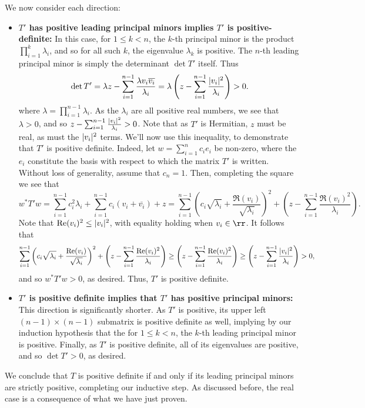 \documentclass{scrartcl}
\begin{document}
\begin{solution}
        We now consider each direction:
        \begin{itemize}
            \item \textbf{$T'$ has positive leading principal minors implies $T'$ is positive-definite:} In this case, for $1\le k <n$, the $k$-th principal minor is the product $\prod_{i=1}^k \lambda_i$, and so for all such $k$, the eigenvalue $\lambda_k$ is positive. The $n$-th leading principal minor is simply the determinant $\det T'$ itself. Thus
            \[\det T'=\lambda z - \sum_{i=1}^{n-1} \frac{\lambda v_i\overline{v_i}}{\lambda_i}=\lambda\left(z - \sum_{i=1}^{n-1} \frac{ \lvert v_i\rvert^2}{\lambda_i}\right)>0.\]
            where $\lambda=\prod_{i=1}^{n-1}\lambda_i$. As the $\lambda_i$ are all positive real numbers, we see that $\lambda>0$, and so $z - \sum_{i=1}^{n-1} \frac{ \lvert v_i\rvert^2}{\lambda_i}>0$. Note that as $T'$ is Hermitian, $z$ must be real, as must the $\lvert v_i\rvert^2$ terms. We'll now use this inequality, to demonstrate that $T'$ is positive definite. Indeed, let $w=\sum_{i=1}^n c_ie_i$ be non-zero, where the $e_i$ constitute the basis with respect to which the matrix $T'$ is written. Without loss of generality, assume that $c_n=1$. Then, completing the square we see that 
            \[w^\ast T' w=\sum_{i=1}^{n-1} c_i^2\lambda_i+\sum_{i=1}^{n-1}c_i(v_i+\overline{v_i})+z=\sum_{i=1}^{n-1} \left(c_i\sqrt{\lambda_i} + \frac{\Re (v_i)}{\sqrt{\lambda_i}}\right)^2 + \left(z-\sum_{i=1}^{n-1}\frac{\Re (v_i)^2}{\lambda_i} \right).\]
            Note that $\operatorname{Re} (v_i)^2\le \lvert v_i\rvert^2$, with equality holding when $v_i\in \rr$. It follows that
            \[\sum_{i=1}^{n-1} \left(c_i\sqrt{\lambda_i} + \frac{\operatorname{Re} (v_i)}{\sqrt{\lambda_i}}\right)^2 + \left(z-\sum_{i=1}^{n-1}\frac{\operatorname{Re} (v_i)^2}{\lambda_i} \right)\ge \left(z-\sum_{i=1}^{n-1}\frac{\operatorname{Re} (v_i)^2}{\lambda_i} \right) \ge \left(z-\sum_{i=1}^{n-1}\frac{\lvert v_i\rvert^2}{\lambda_i} \right)>0,\]
            and so $w^\ast T' w>0$, as desired. Thus, $T'$ is positive definite.
            
            \item \textbf{$T'$ is positive definite implies that $T'$ has positive principal minors:} This  direction is significantly shorter. As $T'$ is positive, its upper left $(n-1)\times (n-1)$ submatrix is positive definite as well, implying by our induction hypothesis that the for $1\le k < n$, the $k$-th leading principal minor is positive. Finally, as $T'$ is positive definite, all of its eigenvalues are positive, and so $\det T'>0$, as desired.
        \end{itemize}
        We conclude that $T$ is positive definite if and only if its leading principal minors are strictly positive, completing our inductive step. As discussed before, the real case is a consequence of what we have just proven.
    \end{solution}
    
\end{document}
